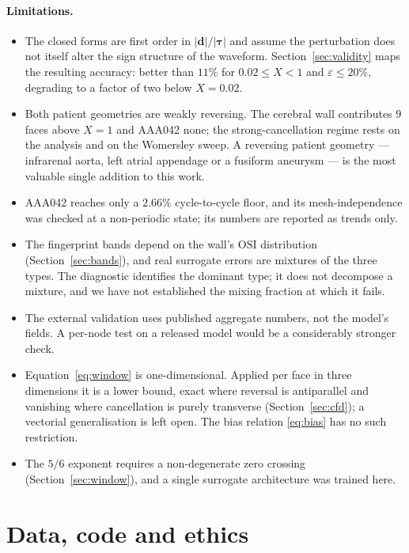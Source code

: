 \documentclass[11pt,a4paper]{article}
\newcommand{\OSI}{\mathrm{OSI}}
\newcommand{\eps}{\varepsilon}
\begin{document}
\paragraph{Limitations.}
\begin{itemize}
\item The closed forms are first order in $|\mathbf d|/|\boldsymbol\tau|$ and
assume the perturbation does not itself alter the sign structure of the
waveform. Section~\ref{sec:validity} maps the resulting accuracy: better than
$11\%$ for $0.02\le X<1$ and $\eps\le20\%$, degrading to a factor of two
below $X=0.02$.
\item Both patient geometries are weakly reversing. The cerebral wall
contributes $9$ faces above $X=1$ and AAA042 none; the strong-cancellation
regime rests on the analysis and on the Womersley sweep. A reversing patient
geometry --- infrarenal aorta, left atrial appendage or a fusiform aneurysm
--- is the most valuable single addition to this work.
\item AAA042 reaches only a $2.66\%$ cycle-to-cycle floor, and its
mesh-independence was checked at a non-periodic state; its numbers are
reported as trends only.
\item The fingerprint bands depend on the wall's $\OSI$ distribution
(Section~\ref{sec:bands}), and real surrogate errors are mixtures of the
three types. The diagnostic identifies the dominant type; it does not
decompose a mixture, and we have not established the mixing fraction at which
it fails.
\item The external validation uses published aggregate numbers, not the
model's fields. A per-node test on a released model would be a considerably
stronger check.
\item Equation~\eqref{eq:window} is one-dimensional. Applied per face in
three dimensions it is a lower bound, exact where reversal is antiparallel
and vanishing where cancellation is purely transverse
(Section~\ref{sec:cfd}); a vectorial generalisation is left open. The bias
relation \eqref{eq:bias} has no such restriction.
\item The $5/6$ exponent requires a non-degenerate zero crossing
(Section~\ref{sec:window}), and a single surrogate architecture was trained
here.
\end{itemize}

\section*{Data, code and ethics}
\end{document}
